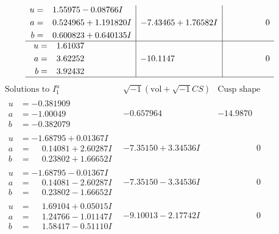 \documentclass[1p]{elsarticle_modified}
\theoremstyle{definition}
\newcommand{\I}{\sqrt{-1}}
\begin{document}
$$\begin{array}{c|c|c}
\begin{aligned}
u &= \phantom{-}1.55975 - 0.08766 I \\
a &= \phantom{-}0.524965 + 1.191820 I \\
b &= \phantom{-}0.600823 + 0.640135 I\end{aligned}
 & -7.43465 + 1.76582 I & \phantom{-0.000000 } 0 \\ \hline\begin{aligned}
u &= \phantom{-}1.61037\phantom{ +0.000000I} \\
a &= \phantom{-}3.62252\phantom{ +0.000000I} \\
b &= \phantom{-}3.92432\phantom{ +0.000000I}\end{aligned}
 & -10.1147\phantom{ +0.000000I} & \phantom{-0.000000 } 0\\
 \hline 
 \end{array}$$\newpage$$\begin{array}{c|c|c}  
\text{Solutions to }I^u_{1}& \I (\text{vol} + \sqrt{-1}CS) & \text{Cusp shape}\\
 \hline 
\begin{aligned}
u &= -0.381909\phantom{ +0.000000I} \\
a &= -1.00049\phantom{ +0.000000I} \\
b &= -0.382079\phantom{ +0.000000I}\end{aligned}
 & -0.657964\phantom{ +0.000000I} & -14.9870\phantom{ +0.000000I} \\ \hline\begin{aligned}
u &= -1.68795 + 0.01367 I \\
a &= \phantom{-}0.14081 + 2.60287 I \\
b &= \phantom{-}0.23802 + 1.66652 I\end{aligned}
 & -7.35150 + 3.34536 I & \phantom{-0.000000 } 0 \\ \hline\begin{aligned}
u &= -1.68795 - 0.01367 I \\
a &= \phantom{-}0.14081 - 2.60287 I \\
b &= \phantom{-}0.23802 - 1.66652 I\end{aligned}
 & -7.35150 - 3.34536 I & \phantom{-0.000000 } 0 \\ \hline\begin{aligned}
u &= \phantom{-}1.69104 + 0.05015 I \\
a &= \phantom{-}1.24766 - 1.01147 I \\
b &= \phantom{-}1.58417 - 0.51110 I\end{aligned}
 & -9.10013 - 2.17742 I & \phantom{-0.000000 } 0 \\ \hline\begin{aligned}

\end{aligned}
\end{array}$$
\end{document}

